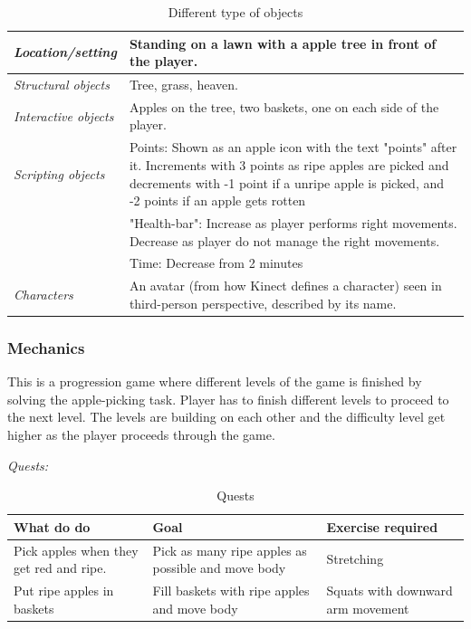 \begin{table} [H]
\centering
    \begin{tabular}{|p{}|p{}|}
       \hline
        \emph{Location/setting} & Standing on a lawn with a apple tree in front of the player. \\ \hline
       \emph{Structural objects} & Tree, grass, heaven.  \\ \hline
       \emph{Interactive objects} & Apples on the tree, two baskets, one on each side of the player. \\ \hline
	   \emph{Scripting objects} &  Points: Shown as an apple icon with the text "points" after it. Increments with 3 points as ripe apples are picked and decrements with -1 point if a unripe apple is picked, and -2 points if an apple gets rotten \\ \cline{2-2}
	   & "Health-bar": Increase as player performs right  movements. Decrease as player do not manage the right  movements.  \\ \cline{2-2}
	   & Time: Decrease from 2 minutes \\ \hline
	   \emph{Characters} & An avatar (from how Kinect defines a character) seen in third-person perspective, described by its name. \\ \hline
    \end{tabular}
    \caption[Various objects in the "Picking Apples" game]{Different type of objects}
    \label{tab:objects2}
\end{table}  
 
\subsubsection{Mechanics} 
This is a progression game where different levels of the game is finished by solving the apple-picking task. Player has to finish different levels to proceed to the next level. The levels are building on each other and the difficulty level get higher as the player proceeds through the game.

\emph{Quests:} 

\begin{table}
     \begin{tabular}{|>{\raggedright}p{}|>{\raggedright}p{4cm}|p{}|}
       \hline
        \textbf{What do do} & \textbf{Goal} & \textbf{Exercise required}  \\ \hline
       Pick apples when they get red and ripe. & Pick as many ripe apples as possible and move body & Stretching  \\ \hline
       Put ripe apples in baskets & Fill baskets with ripe apples and move body &  Squats with downward arm movement \\ \hline
      \end{tabular}
      \caption[Quests in the "Apple Picking" game]{Quests}
    \label{tab:quests2}
 \end{table}

